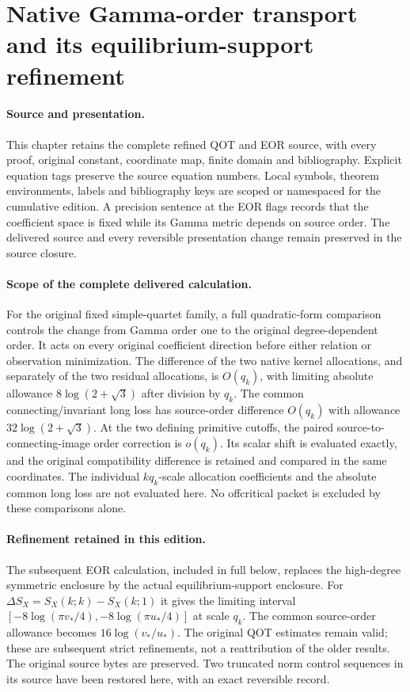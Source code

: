 \documentclass[11pt,a4paper]{article}
\begin{document}
\section{Native Gamma-order transport and its equilibrium-support refinement}
\label{sec:QOT_EOR}
\paragraph{Source and presentation.}
This chapter retains the complete refined QOT and EOR source, with every
proof, original constant, coordinate map, finite domain and bibliography.
Explicit equation tags preserve the source equation numbers. Local symbols,
theorem environments, labels and bibliography keys are scoped or namespaced
for the cumulative edition. A precision sentence at the EOR flags records
that the coefficient space is fixed while its Gamma metric depends on source
order. The delivered source and every reversible presentation change remain
preserved in the source closure.

\paragraph{Scope of the complete delivered calculation.}
For the original fixed simple-quartet family, a full quadratic-form comparison controls the change from Gamma order one to the original degree-dependent order. It acts on every original coefficient direction before either relation or observation minimization. The difference of the two native kernel allocations, and separately of the two residual allocations, is $O(q_k)$, with limiting absolute allowance $8\log(2+\sqrt3)$ after division by $q_k$. The common connecting/invariant long loss has source-order difference $O(q_k)$ with allowance $32\log(2+\sqrt3)$. At the two defining primitive cutoffs, the paired source-to-connecting-image order correction is $o(q_k)$. Its scalar shift is evaluated exactly, and the original compatibility difference is retained and compared in the same coordinates. The individual $kq_k$-scale allocation coefficients and the absolute common long loss are not evaluated here. No offcritical packet is excluded by these comparisons alone.

\paragraph{Refinement retained in this edition.}
The subsequent EOR calculation, included in full below, replaces the high-degree
symmetric enclosure by the actual equilibrium-support enclosure. For
$\Delta S_X=S_X(k;k)-S_X(k;1)$ it gives the limiting interval
$[-8\log(\pi v_*/4),-8\log(\pi u_*/4)]$ at scale $q_k$.
The common source-order allowance becomes $16\log(v_*/u_*)$.
The original QOT estimates remain valid; these are subsequent strict refinements,
not a reattribution of the older results. The original source bytes are preserved.
Two truncated norm control sequences in its source have been restored here,
with an exact reversible record.
\end{document}
